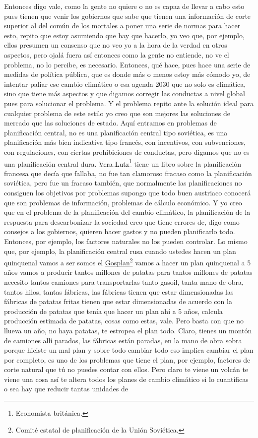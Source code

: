 Entonces digo vale, como la gente no quiere o no es capaz de llevar a cabo esto pues tienen que venir los gobiernos que sabe que tienen una información de corte superior al del común de los mortales a poner una serie de normas para hacer esto, repito que estoy asumiendo que hay que hacerlo, yo veo que, por ejemplo, ellos presumen un consenso que no veo yo a la hora de la verdad en otros aspectos, pero ojalá fuera así entonces como la gente no entiende, no ve el problema, no lo percibe, es necesario. Entonces, qué hace, pues hace una serie de medidas de política pública, que es donde más o menos estoy más cómodo yo, de intentar paliar ese cambio climático o esa agenda 2030 que no solo es climática, sino que tiene más aspectos y que digamos corregir las conductas a nivel global pues para solucionar el problema. Y el problema repito ante la solución ideal para cualquier problema de este estilo yo creo que son mejores las soluciones de mercado que las soluciones de estado. Aquí entramos en problemas de planificación central, no es una planificación central tipo soviética, es una planificación más bien indicativa tipo francés, con incentivos, con subvenciones, con regulaciones, con ciertas prohibiciones de conductas, pero digamos que no es una planificación central dura. \href{https://en.wikipedia.org/wiki/Vera_Lutz}{Vera Lutz}\footnote{Economista británica.} tiene un libro sobre la planificación francesa\cite{lutz1965french} que decía que fallaba, no fue tan clamoroso fracaso como la planificación soviética, pero fue un fracaso también, que normalmente las planificaciones no consiguen los objetivos por problemas supongo que todo buen austriaco conocerá que son problemas de información, problemas de cálculo económico. Y yo creo que en el problema de la planificación del cambio climático, la planificación de la respuesta para descarbonizar la sociedad creo que tiene errores de, digo como consejos a los gobiernos, quieren hacer gastos y no pueden planificarlo todo. Entonces, por ejemplo, los factores naturales no los pueden controlar. Lo mismo que, por ejemplo, la planificación central rusa cuando ustedes hacen un plan quinquenal vamos a ser somos el \href{https://en.wikipedia.org/wiki/Gosplan}{Gosplan}\footnote{Comité estatal de planificación de la Unión Soviética.} vamos a hacer un plan quinquenal a 5 años vamos a producir tantos millones de patatas para tantos millones de patatas necesito tantos camiones para transportarlas tanto gasoil, tanta mano de obra, tantos hilos, tantas fábricas, las fábricas tienen que estar dimensionadas las fábricas de patatas fritas tienen que estar dimensionadas de acuerdo con la producción de patatas que tenía que hacer un plan ahí a 5 años, calcula producción estimada de patatas, cosas como estas, vale. Pero basta con que no llueva un año, no haya patatas, te estropea el plan todo. Claro, tienes un montón de camiones allí parados, las fábricas están paradas, en la mano de obra sobra porque hiciste un mal plan y sobre todo cambiar todo eso implica cambiar el plan por completo, es uno de los problemas que tiene el plan, por ejemplo, factores de corte natural que tú no puedes contar con ellos. Pero claro te viene un volcán te viene una cosa así te altera todos los planes de cambio climático si lo cuantificas o sea hay que reducir tantas unidades de 